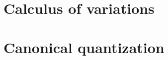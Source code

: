 \documentclass[a4paper]{article}
\theoremstyle{definition}
\numberwithin{equation}{section}
\begin{document}
  \newpage

  \begin{appendices}
    \section{Calculus of variations}\label{appendix: calculus of variation}
    

    \section{Canonical quantization}\label{appendix:canonical_quantization}
    
  \end{appendices}

  \newpage

  \printbibliography{}
\end{document}
